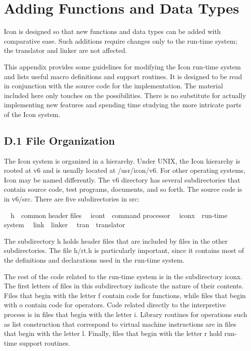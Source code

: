 \chapter{Adding Functions and Data Types}

Icon is designed so that new functions and data types can be added
with comparative ease. Such additions require changes only to the
run-time system; the translator and linker are not affected.


This appendix provides some guidelines for modifying the Icon run-time
system and lists useful macro definitions and support routines. It is
designed to be read in conjunction with the source code for the
implementation. The material included here only touches on the
possibilities. There is no substitute for actually implementing new
features and spending time studying the more intricate parts of the
Icon system.

\section{D.1 File Organization}

The Icon system is organized in a hierarchy. Under UNIX, the Icon
hierarchy is rooted at v6 and is usually located at /usr/icon/v6. For
other operating systems, Icon may be named differently. The v6
directory has several subdirectories that contain source code, test
programs, documents, and so forth. The source code is in v6/src. There
are five subdirectories in src:


\ \ h\ \ common header files\newline
\ \ icont\ \ command processor\newline
\ \ iconx\ \ run-time system\newline
\ \ link\ \ linker\newline
\ \ tran\ \ translator


The subdirectory h holds header files that are included by files in
the other subdirectories. The file h/rt.h is particularly important,
since it contains most of the definitions and declarations used in the
run-time system.

The rest of the code related to the run-time system is in the
subdirectory iconx. The first letters of files in this subdirectory
indicate the nature of their contents. Files that begin with the
letter f contain code for functions, while files that begin with o
contain code for operators. Code related directly to the interpretive
process is in files that begin with the letter
i. {\textquotedbl}Library{\textquotedbl} routines for operations such
as list construction that correspond to virtual machine instructions
are in files that begin with the letter l. Finally, files that begin
with the letter r hold run-time support routines.

